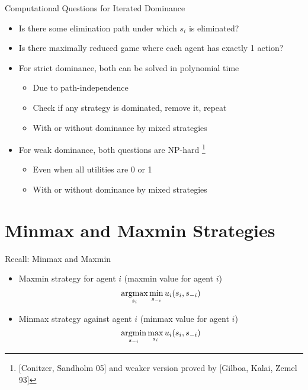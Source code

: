 \documentclass[11pt,aspectratio=169]{beamer}
\begin{document}
   \begin{frame}{Computational Questions for Iterated Dominance}
    \begin{itemize}[<+->]
    \setlength{\itemsep}{1.2em}
     \item Is there some elimination path under which $s_i$ is eliminated?
     \item Is there maximally reduced game where each agent has exactly 1 action?
     \item For \alert{strict dominance}, both can be solved in polynomial time
     \begin{itemize}[<.->]
      \item Due to path-independence
      \item Check if any strategy is dominated, remove it, repeat
      \item With or without dominance by mixed strategies
     \end{itemize} 
     \item For \alert{weak dominance}, both questions are NP-hard%
      \footnote<4->{\scriptsize[Conitzer, Sandholm 05] and weaker version proved by [Gilboa, Kalai, Zemel 93]}
     \begin{itemize}[<.->]
      \item Even when all utilities are 0 or 1
      \item With or without dominance by mixed strategies
     \end{itemize}
    \end{itemize}
   \end{frame}
   
 \section{Minmax and Maxmin Strategies}
  \begin{frame}{Recall: Minmax and Maxmin}
   \begin{itemize}
    \item<1-> \alert{Maxmin} strategy for agent $i$ (maxmin value for agent $i$)
    $$
     \operatorname*{argmax}_{s_i} \min_{s_{-i}} u_i(s_i, s_{-i})
    $$
    \item<2-> \alert{Minmax} strategy against agent $i$ (minmax value for agent $i$)
    $$
     \operatorname*{argmin}_{s_{-i}} \max_{s_{i}} u_i(s_i, s_{-i})
    $$
   \end{itemize}
  \end{frame}
  
\end{document}
